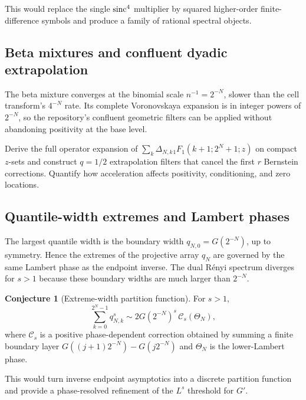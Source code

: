 \documentclass[11pt]{article}
\theoremstyle{definition}
\newtheorem{conjecture}[theorem]{Conjecture}
\theoremstyle{remark}
\begin{document}
This would replace the single $\operatorname{sinc}^4$ multiplier by squared higher-order
finite-difference symbols and produce a family of rational spectral objects.

\subsection{Beta mixtures and confluent dyadic extrapolation}

The beta mixture converges at the binomial scale $n^{-1}=2^{-N}$, slower than
the cell transform's $4^{-N}$ rate.  Its complete Voronovskaya expansion is in
integer powers of $2^{-N}$, so the repository's confluent geometric filters can
be applied without abandoning positivity at the base level.

\begin{openproblem}
\label{p3:op:beta-acceleration}
Derive the full operator expansion of
$\sum_k\Delta_{N,k}{}_1F_1(k+1;2^N+1;z)$ on compact $z$-sets and construct
$q=1/2$ extrapolation filters that cancel the first $r$ Bernstein corrections.
Quantify how acceleration affects positivity, conditioning, and zero locations.
\end{openproblem}

\subsection{Quantile-width extremes and Lambert phases}

The largest quantile width is the boundary width
$q_{N,0}=G(2^{-N})$, up to symmetry.  Hence the extremes of the projective array
$q_N$ are governed by the same Lambert phase as the endpoint inverse.
The dual R\'enyi spectrum diverges for $s>1$ because these boundary widths are
much larger than $2^{-N}$.

\begin{conjecture}[Extreme-width partition function]
\label{p3:conj:q-width-partition}
For $s>1$,
\begin{equation}\label{p3:eq:q-width-conj}
 \sum_{k=0}^{2^N-1}q_{N,k}^s
 \sim2G(2^{-N})^s\,\mathcal C_s(\Theta_N),
\end{equation}
where $\mathcal C_s$ is a positive phase-dependent correction obtained by
summing a finite boundary layer
$G((j+1)2^{-N})-G(j2^{-N})$ and $\Theta_N$ is the lower-Lambert phase.
\end{conjecture}

This would turn inverse endpoint asymptotics into a discrete partition function
and provide a phase-resolved refinement of the $L^s$ threshold for $G'$.
\end{document}
